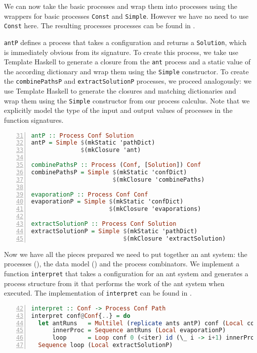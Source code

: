 We can now take the basic processes and wrap them into processes using the wrappers for basic processes \texttt{Const} and \texttt{Simple}. However we have no need to use \texttt{Const} here. The resulting processes processes can be found in .

\texttt{antP} defines a process that takes a configuration and returns a \texttt{Solution}, which is immediately obvious from its signature. To create this process, we take use \textsf{Template Haskell} to generate a closure from the \texttt{ant} process and a static value of the according dictionary and wrap them using the \texttt{Simple} constructor. To create the \texttt{combinePathsP} and \texttt{extractSolutionP} processes, we proceed analogously: we use \textsf{Template Haskell} to generate the closures and matching dictionaries and wrap them using the \texttt{Simple} constructor from our process calculus. Note that we explicitly model the type of the input and output values of processes in the function signatures.

\begin{lstlisting}[language=Haskell,frame=tb,numbers=left,firstnumber=31,label=lst:ant_hive,caption={Processes, built up from previously defined basic processes.}]
antP :: Process Conf Solution
antP = Simple $(mkStatic 'pathDict)
              $(mkClosure 'ant)

combinePathsP :: Process (Conf, [Solution]) Conf
combinePathsP = Simple $(mkStatic 'confDict)
                       $(mkClosure 'combinePaths)

evaporationP :: Process Conf Conf
evaporationP = Simple $(mkStatic 'confDict)
                      $(mkClosure 'evaporations)

extractSolutionP :: Process Conf Solution
extractSolutionP = Simple $(mkStatic 'pathDict)
                          $(mkClosure 'extractSolution)
\end{lstlisting}

Now we have all the pieces prepared we need to put together an ant system: the processes (), the data model () and the process combinators. We implement a function \texttt{interpret} that takes a configuration for an ant system and generates a process structure from it that performs the work of the ant system when executed. The implementation of \texttt{interpret} can be found in .

\begin{lstlisting}[language=Haskell,frame=tb,numbers=left,firstnumber=42,label=lst:ant_system_complete,caption=Transformation of a configuration for an ant system into a process hierarchy.]
interpret :: Conf -> Process Conf Path
interpret conf@Conf{..} = do
  let antRuns   = Multilel (replicate ants antP) conf (Local combinePathsP)
      innerProc = Sequence antRuns (Local evaporationP)
      loop      = Loop conf 0 (<iter) id (\_ i -> i+1) innerProc
  Sequence loop (Local extractSolutionP)
\end{lstlisting}

